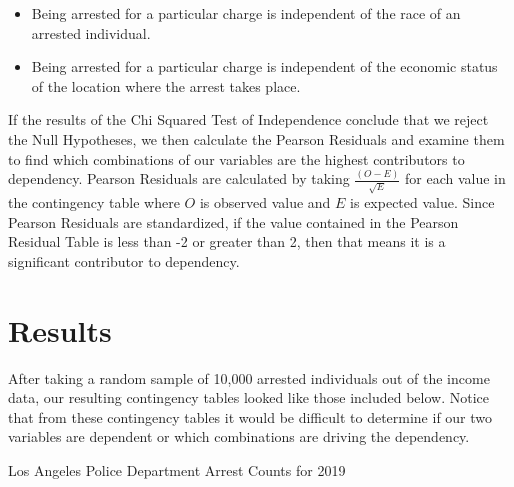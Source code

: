\documentclass{article}
\begin{document}
\begin{itemize}
    \item Being arrested for a particular charge is independent of the race of an arrested individual.
    \item Being arrested for a particular charge is independent of the economic status of the location where the arrest takes place.
\end{itemize}

If the results of the Chi Squared Test of Independence conclude that we reject the Null Hypotheses, we then calculate the Pearson Residuals and examine them to find which combinations of our variables are the highest contributors to dependency. Pearson Residuals are calculated by taking $\frac{(O-E)}{\sqrt{E}}$ for each value in the contingency table where $O$ is observed value and $E$ is expected value. Since Pearson Residuals are standardized, if the value contained in the Pearson Residual Table is less than -2 or greater than 2, then that means it is a significant contributor to dependency.  


\newpage
\section{Results}
After taking a random sample of 10,000 arrested individuals out of the income data, our resulting contingency tables looked like those included below. Notice that from these contingency tables it would be difficult to determine if our two variables are dependent or which combinations are driving the dependency. 





\begin{center}
    Los Angeles Police Department Arrest Counts for 2019
\end{center}


    
\end{document}
